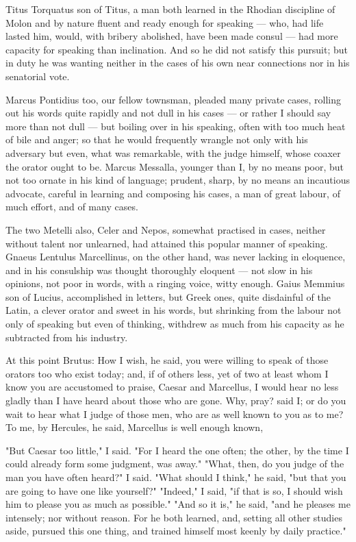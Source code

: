  Titus Torquatus son of Titus, a man both learned in the Rhodian discipline of Molon and by nature fluent and ready enough for speaking — who, had life lasted him, would, with bribery abolished, have been made consul — had more capacity for speaking than inclination. And so he did not satisfy this pursuit; but in duty he was wanting neither in the cases of his own near connections nor in his senatorial vote.

 Marcus Pontidius too, our fellow townsman, pleaded many private cases, rolling out his words quite rapidly and not dull in his cases — or rather I should say more than not dull — but boiling over in his speaking, often with too much heat of bile and anger; so that he would frequently wrangle not only with his adversary but even, what was remarkable, with the judge himself, whose coaxer the orator ought to be. Marcus Messalla, younger than I, by no means poor, but not too ornate in his kind of language; prudent, sharp, by no means an incautious advocate, careful in learning and composing his cases, a man of great labour, of much effort, and of many cases.

 The two Metelli also, Celer and Nepos, somewhat practised in cases, neither without talent nor unlearned, had attained this popular manner of speaking. Gnaeus Lentulus Marcellinus, on the other hand, was never lacking in eloquence, and in his consulship was thought thoroughly eloquent — not slow in his opinions, not poor in words, with a ringing voice, witty enough. Gaius Memmius son of Lucius, accomplished in letters, but Greek ones, quite disdainful of the Latin, a clever orator and sweet in his words, but shrinking from the labour not only of speaking but even of thinking, withdrew as much from his capacity as he subtracted from his industry.

 At this point Brutus: How I wish, he said, you were willing to speak of those orators too who exist today; and, if of others less, yet of two at least whom I know you are accustomed to praise, Caesar and Marcellus, I would hear no less gladly than I have heard about those who are gone. Why, pray? said I; or do you wait to hear what I judge of those men, who are as well known to you as to me? To me, by Hercules, he said, Marcellus is well enough known,

 "But Caesar too little," I said. "For I heard the one often; the other, by the time I could already form some judgment, was away." "What, then, do you judge of the man you have often heard?" I said. "What should I think," he said, "but that you are going to have one like yourself?" "Indeed," I said, "if that is so, I should wish him to please you as much as possible." "And so it is," he said, "and he pleases me intensely; nor without reason. For he both learned, and, setting all other studies aside, pursued this one thing, and trained himself most keenly by daily practice."

